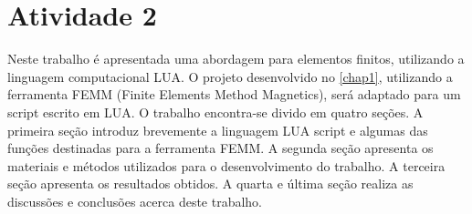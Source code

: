 \chapter{Atividade 2}
\label{chap2}
Neste trabalho é apresentada uma abordagem para elementos finitos, utilizando a linguagem computacional LUA. O projeto desenvolvido no \ref{chap1}, utilizando a ferramenta FEMM (Finite Elements Method Magnetics), será adaptado para um script escrito em LUA. O trabalho encontra-se divido em quatro seções. A primeira seção introduz brevemente a linguagem LUA script e algumas das funções destinadas para a ferramenta FEMM. A segunda seção apresenta os materiais e métodos utilizados para o desenvolvimento do trabalho. A terceira seção apresenta os resultados obtidos. A quarta e última seção realiza as discussões e conclusões acerca deste trabalho.
\newpage
\pagebreak

\newpage
\pagebreak

\newpage
\pagebreak

\newpage
\pagebreak

